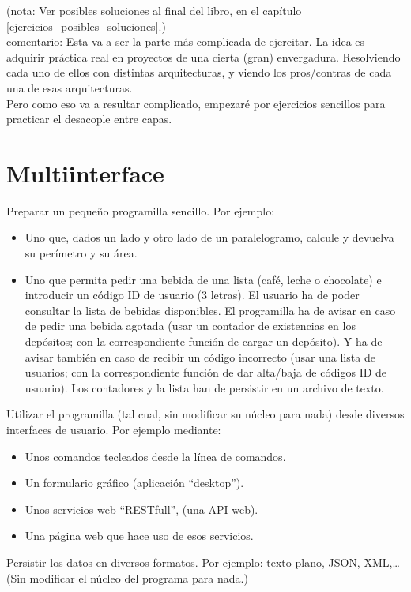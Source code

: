 \documentclass[spanish,12pt,a4paper,final,oneside]{book}
\begin{document}
(nota: Ver posibles soluciones al final del libro, en el capítulo \ref{ejercicios_posibles_soluciones}.)\\

comentario: Esta va a ser la parte más complicada de ejercitar. La idea es adquirir práctica real en proyectos de una cierta (gran) envergadura. Resolviendo cada uno de ellos con distintas arquitecturas, y viendo los pros/contras de cada una de esas arquitecturas.
\\Pero como eso va a resultar complicado, empezaré por ejercicios sencillos para practicar el desacople entre capas.


\section{Multiinterface}\label{ejercicio_multiinterface}

Preparar un pequeño programilla sencillo. Por ejemplo:
\begin{itemize}
\item Uno que, dados un lado y otro lado de un paralelogramo, calcule y devuelva su perímetro y su área.
\item Uno que permita pedir una bebida de una lista (café, leche o chocolate) e introducir un código {\footnotesize ID} de usuario (3 letras). El usuario ha de poder consultar la lista de bebidas disponibles. El programilla ha de avisar en caso de pedir una bebida agotada (usar un contador de existencias en los depósitos; con la correspondiente función de cargar un depósito). Y ha de avisar también en caso de recibir un código incorrecto (usar una lista de usuarios; con la correspondiente función de dar alta/baja de códigos {\footnotesize ID} de usuario). Los contadores y la lista han de persistir en un archivo de texto. 
\end{itemize}

Utilizar el programilla (tal cual, sin modificar su núcleo para nada) desde diversos interfaces de usuario. Por ejemplo mediante:
\begin{itemize}
\item Unos comandos tecleados desde la línea de comandos.
\item Un formulario gráfico (aplicación ``desktop'').
\item Unos servicios web ``RESTfull'', (una API web).
\item Una página web que hace uso de esos servicios.
\end{itemize}

Persistir los datos en diversos formatos. Por ejemplo: texto plano, JSON, XML,\ldots (Sin modificar el núcleo del programa para nada.)
\end{document}
